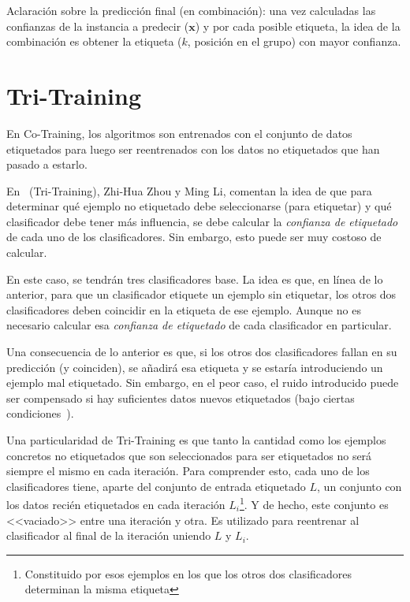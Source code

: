 Aclaración sobre la predicción final (en combinación): una vez calculadas las
confianzas de la instancia a predecir ($\mathbf{x}$) y por cada posible etiqueta, la idea
de la combinación es obtener la etiqueta ($k$, posición en el grupo) con mayor
confianza.

\clearpage
\clearpage

\section{Tri-Training}

En Co-Training, los algoritmos son entrenados con el conjunto de datos
etiquetados para luego ser reentrenados con los datos no etiquetados que han
pasado a estarlo.

En~\cite{1512038} (Tri-Training), Zhi-Hua Zhou y Ming Li, comentan la idea de
que para determinar qué ejemplo no etiquetado debe seleccionarse (para
etiquetar) y qué clasificador debe tener más influencia, se debe calcular la
\textit{confianza de etiquetado} de cada uno de los clasificadores. Sin embargo, esto
puede ser muy costoso de calcular.

En este caso, se tendrán tres clasificadores base. La idea es que, en línea de
lo anterior, para que un clasificador etiquete un ejemplo sin etiquetar, los
otros dos clasificadores deben coincidir en la etiqueta de ese ejemplo. Aunque
no es necesario calcular esa \textit{confianza de etiquetado} de cada
clasificador en particular.

Una consecuencia de lo anterior es que, si los otros dos clasificadores fallan
en su predicción (y coinciden), se añadirá esa etiqueta y se estaría
introduciendo un ejemplo mal etiquetado. Sin embargo, en el peor caso, el ruido
introducido puede ser compensado si hay suficientes datos nuevos etiquetados
(bajo ciertas condiciones~\cite{1512038}).

Una particularidad de Tri-Training es que tanto la cantidad como los ejemplos
concretos no etiquetados que son seleccionados para ser etiquetados no será
siempre el mismo en cada iteración. Para comprender esto, cada uno de los
clasificadores tiene, aparte del conjunto de entrada etiquetado $L$, un conjunto
con los datos recién etiquetados en cada iteración $L_i$\footnote{Constituido
por esos ejemplos en los que los otros dos clasificadores determinan la misma
etiqueta}. Y de hecho, este conjunto es <<vaciado>> entre una iteración y otra.
Es utilizado para reentrenar al clasificador al final de la iteración uniendo
$L$ y $L_i$.

